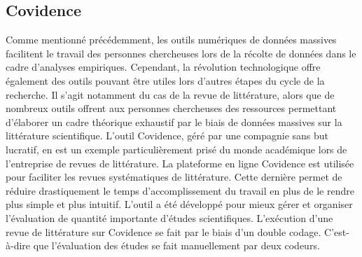 \documentclass[
  letterpaper,
]{scrbook}
\begin{document}
\hypertarget{covidence}{%
\subsection{Covidence}\label{covidence}}

Comme mentionné précédemment, les outils numériques de données massives
facilitent le travail des personnes chercheuses lors de la récolte de
données dans le cadre d'analyses empiriques. Cependant, la révolution
technologique offre également des outils pouvant être utiles lors
d'autres étapes du cycle de la recherche. Il s'agit notamment du cas de
la revue de littérature, alors que de nombreux outils offrent aux
personnes chercheuses des ressources permettant d'élaborer un cadre
théorique exhaustif par le biais de données massives sur la littérature
scientifique. L'outil Covidence, géré par une compagnie sans but
lucratif, en est un exemple particulièrement prisé du monde académique
lors de l'entreprise de revues de littérature. La plateforme en ligne
Covidence est utilisée pour faciliter les revues systématiques de
littérature. Cette dernière permet de réduire drastiquement le temps
d'accomplissement du travail en plus de le rendre plus simple et plus
intuitif. L'outil a été développé pour mieux gérer et organiser
l'évaluation de quantité importante d'études scientifiques. L'exécution
d'une revue de littérature sur Covidence se fait par le biais d'un
double codage. C'est- à-dire que l'évaluation des études se fait
manuellement par deux codeurs.
\end{document}
